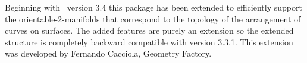 
{
Beginning with \cgal\ version 3.4 this package has been extended
to efficiently support the orientable-2-manifolds that correspond to the topology 
of the arrangement of curves on surfaces.
The added features are purely an extension so the extended structure is completely 
backward compatible with version 3.3.1.
This extension was developed by Fernando Cacciola, Geometry Factory.
}
